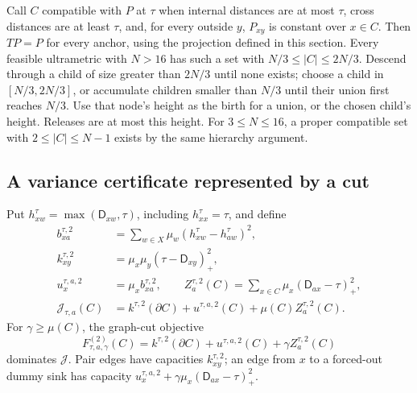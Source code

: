 \documentclass[11pt]{article}
\theoremstyle{definition}
\newcommand{\cut}{\partial}
\begin{document}
Call $C$ compatible with $P$ at $\tau$ when internal distances are at
most $\tau$, cross distances are at least $\tau$, and, for every outside
$y$, $P_{xy}$ is constant over $x\in C$. Then $TP=P$ for every anchor, using the projection defined in this section.
Every feasible ultrametric with $N>16$ has such a set with
$N/3\le |C|\le2N/3$. Descend through a child of size greater than
$2N/3$ until none exists; choose a child in $[N/3,2N/3]$, or accumulate
children smaller than $N/3$ until their union first reaches $N/3$.
Use that node's height as the birth for a union, or the chosen child's
height. Releases are at most this height. For $3\le N\le16$, a proper
compatible set with $2\le |C|\le N-1$ exists by the same hierarchy argument.

\subsection{A variance certificate represented by a cut}

Put $h^\tau_{xw}=\max(\mathsf D_{xw},\tau)$, including $h^\tau_{xx}=\tau$,
and define
\begin{align*}
 b^{\tau,2}_{xa}&=\sum_{w\in X}\mu_w(h^\tau_{xw}-h^\tau_{aw})^2,\\
 k^{\tau,2}_{xy}&=\mu_x\mu_y(\tau-\mathsf D_{xy})_+^2,\\
 u^{\tau,a,2}_x&=\mu_x b^{\tau,2}_{xa},\qquad
 Z^{\tau,2}_a(C)=\sum_{x\in C}\mu_x(\mathsf D_{ax}-\tau)_+^2,\\
 \mathcal J_{\tau,a}(C)&=k^{\tau,2}(\cut C)+u^{\tau,a,2}(C)+\mu(C)Z^{\tau,2}_a(C).
\end{align*}
For $\gamma\ge\mu(C)$, the
graph-cut objective
\begin{equation}\label{l2:eq:F}
 F^{(2)}_{\tau,a,\gamma}(C)
 =k^{\tau,2}(\cut C)+u^{\tau,a,2}(C)+\gamma Z^{\tau,2}_a(C)
\end{equation}
dominates $\mathcal J$. Pair edges have capacities $k^{\tau,2}_{xy}$;
an edge from $x$ to a forced-out dummy sink has capacity
$u^{\tau,a,2}_x+\gamma\mu_x(\mathsf D_{ax}-\tau)_+^2$.
\end{document}
